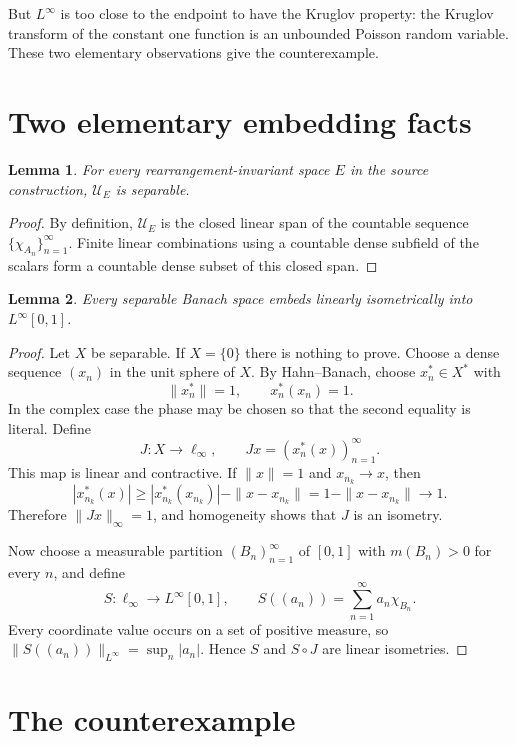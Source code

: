 \documentclass[11pt]{article}
\newtheorem{lemma}{Lemma}
\newcommand{\U}{\mathcal U}
\begin{document}
But $L^\infty$ is too close to the endpoint to have the Kruglov property:
the Kruglov transform of the constant one function is an unbounded Poisson
random variable. These two elementary observations give the counterexample.

\section{Two elementary embedding facts}

\begin{lemma}\label{lem:separable}
For every rearrangement-invariant space $E$ in the source construction,
$\U_E$ is separable.
\end{lemma}

\begin{proof}
By definition, $\U_E$ is the closed linear span of the countable sequence
$\{\chi_{A_n}\}_{n=1}^\infty$. Finite linear combinations using a countable
dense subfield of the scalars form a countable dense subset of this closed
span.
\end{proof}

\begin{lemma}\label{lem:universal}
Every separable Banach space embeds linearly isometrically into
$L^\infty[0,1]$.
\end{lemma}

\begin{proof}
Let $X$ be separable. If $X=\{0\}$ there is nothing to prove. Choose a dense
sequence $(x_n)$ in the unit sphere of $X$. By Hahn--Banach, choose
$x_n^*\in X^*$ with
\[
                    \|x_n^*\|=1,\qquad x_n^*(x_n)=1.
\]
In the complex case the phase may be chosen so that the second equality is
literal. Define
\[
 J:X\longrightarrow\ell_\infty,\qquad
 Jx=(x_n^*(x))_{n=1}^\infty.
\]
This map is linear and contractive. If $\|x\|=1$ and $x_{n_k}\to x$, then
\[
 |x_{n_k}^*(x)|
 \ge |x_{n_k}^*(x_{n_k})|-\|x-x_{n_k}\|
 =1-\|x-x_{n_k}\|\longrightarrow1.
\]
Therefore $\|Jx\|_\infty=1$, and homogeneity shows that $J$ is an isometry.

Now choose a measurable partition $(B_n)_{n=1}^\infty$ of $[0,1]$ with
$m(B_n)>0$ for every $n$, and define
\[
 S:\ell_\infty\longrightarrow L^\infty[0,1],\qquad
 S((a_n))=\sum_{n=1}^\infty a_n\chi_{B_n}.
\]
Every coordinate value occurs on a set of positive measure, so
$\|S((a_n))\|_{L^\infty}=\sup_n|a_n|$. Hence $S$ and $S\circ J$ are linear
isometries.
\end{proof}

\section{The counterexample}
\end{document}
